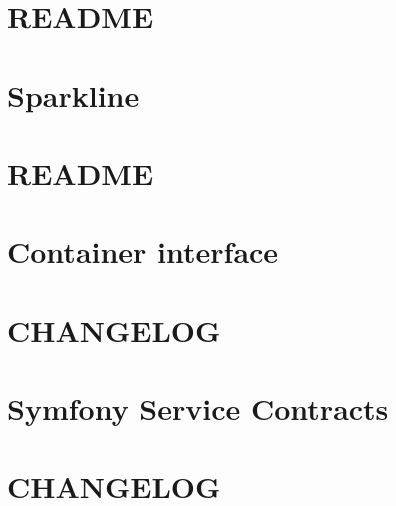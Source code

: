 \let\mypdfximage\pdfximage\def\pdfximage{\immediate\mypdfximage}\documentclass[twoside]{book}
\newcommand{\+}{\discretionary{\mbox{\scriptsize$\hookleftarrow$}}{}{}}
\begin{document}
\chapter{README}
\label{md_vdlp_redirect__r_e_a_d_m_e}

\chapter{Sparkline}
\label{md_vdlp_redirect_vendor_davaxi_sparkline__r_e_a_d_m_e}

\chapter{README}
\label{md_vdlp_redirect_vendor_jaybizzle_crawler_detect__r_e_a_d_m_e}

\chapter{Container interface}
\label{md_vdlp_redirect_vendor_psr_container__r_e_a_d_m_e}

\chapter{CHANGELOG}
\label{md_vdlp_redirect_vendor_symfony_service_contracts__c_h_a_n_g_e_l_o_g}

\chapter{Symfony Service Contracts}
\label{md_vdlp_redirect_vendor_symfony_service_contracts__r_e_a_d_m_e}

\chapter{CHANGELOG}
\label{md_vdlp_redirect_vendor_symfony_stopwatch__c_h_a_n_g_e_l_o_g}

\end{document}
